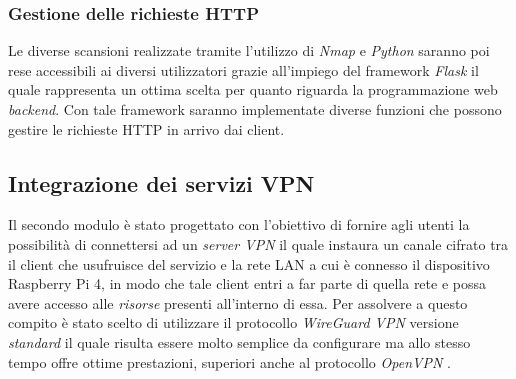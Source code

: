 \subsubsection{Gestione delle richieste HTTP}
Le diverse scansioni realizzate tramite l'utilizzo di \emph{Nmap} e \emph{Python} saranno poi rese accessibili ai diversi utilizzatori grazie all'impiego del framework \emph{Flask} \cite{fl} il quale rappresenta un ottima scelta per quanto riguarda la programmazione web \emph{backend}. Con tale framework saranno implementate diverse funzioni che possono gestire le richieste HTTP in arrivo dai client.


\subsection{Integrazione dei servizi VPN}
Il secondo modulo è stato progettato con l'obiettivo di fornire agli utenti la possibilità di connettersi ad un \emph{server VPN} il quale instaura un canale cifrato tra il client che usufruisce del servizio e la rete LAN a cui è connesso il dispositivo Raspberry Pi 4, in modo che tale client entri a far parte di quella rete e possa avere accesso alle \emph{risorse} presenti all'interno di essa. Per assolvere a questo compito è stato scelto di utilizzare il protocollo \emph{WireGuard VPN} versione \emph{standard} \cite{wir} il quale risulta essere molto semplice da configurare ma allo stesso tempo offre ottime prestazioni, superiori anche al protocollo \emph{OpenVPN} \cite{op}.
